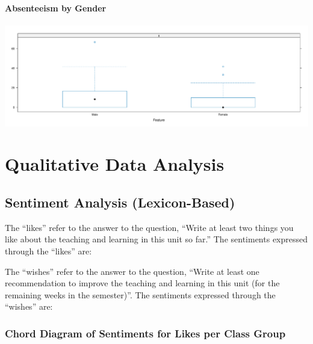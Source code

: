 \documentclass[
]{article}
\begin{document}
\paragraph{Absenteeism by Gender}\label{absenteeism-by-gender}

\includegraphics{Mid-SemesterCourseEvaluation-20240819-20241125-ADB-BBIT2.2_files/figure-latex/AbsenteeismBoxandWhiskerGender-1.pdf}

\newpage

\section{Qualitative Data Analysis}\label{qualitative-data-analysis}

\subsection{Sentiment Analysis
(Lexicon-Based)}\label{sentiment-analysis-lexicon-based}

The ``likes'' refer to the answer to the question, ``Write at least two
things you like about the teaching and learning in this unit so far.''
The sentiments expressed through the ``likes'' are:

The ``wishes'' refer to the answer to the question, ``Write at least one
recommendation to improve the teaching and learning in this unit (for
the remaining weeks in the semester)''. The sentiments expressed through
the ``wishes'' are:

\newpage

\subsubsection{Chord Diagram of Sentiments for Likes per Class
Group}\label{chord-diagram-of-sentiments-for-likes-per-class-group}
\end{document}
